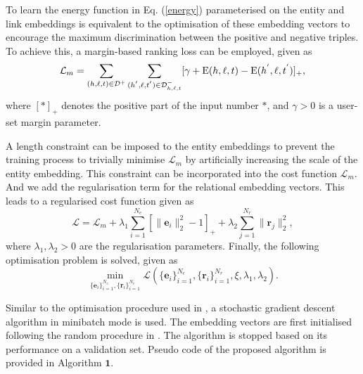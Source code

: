 \documentclass[10pt,journal]{IEEEtran}
\begin{document}
To learn the energy function in Eq. (\ref{energy}) parameterised on the entity and link embeddings is equivalent to the optimisation of these embedding vectors to encourage the maximum discrimination between  the positive  and negative triples. To achieve this, a margin-based ranking loss can be employed, given as
\begin{equation} \label{loss}
\small
\mathcal{L}_m = \sum_{(h,\ell,t)\in \mathcal{D}^+} \sum_{(h^{'},\ell,t^{'})\in  \mathcal{D}^{-}_{h,\ell,t}} [\gamma + \mathrm{E}(h,\ell,t)- \mathrm{E}(h^{'},\ell,t^{'}) ]_+,
\end{equation}
where $[*]_+$ denotes the positive part of the input number $*$, and $\gamma > 0$ is a user-set margin parameter.

A length constraint can be imposed to the entity embeddings to prevent the training process to trivially minimise $\mathcal{L}_m$ by artificially increasing the scale of the entity embedding. This constraint can be incorporated into the cost function $\mathcal{L}_m$.  And we add the regularisation term  for the relational embedding vectors. This leads to a regularised cost function given as
\begin{equation} \label{loss2}
\mathcal{L} = \mathcal{L}_m  +\lambda_1 \sum_{i =1}^{N_e} \left[\|\bm{e}_i\|_2^2 - 1\right]_+ + \lambda_2 \sum_{j=1}^{N_r} \| \bm{r}_{j} \|_2^2,
\end{equation}
where $\lambda_1, \lambda_2 >0$ are the regularisation parameters. Finally, the  following optimisation problem is solved, given as
\begin{equation}
\min_{\{\bm e_i\}_{i=1}^{N_e}, \{\bm r_i\}_{i=1}^{N_r}} \mathcal{L}\left(\{\bm e_i\}_{i=1}^{N_e}, \{\bm r_i\}_{i=1}^{N_r}, \xi,\lambda_1, \lambda_2 \right).
\end{equation}

Similar to the optimisation procedure used in \cite{bordes_translating_2013}, a stochastic gradient descent algorithm in minibatch mode is used. The embedding vectors are first initialised following the random procedure in \cite{glorot_understanding_2010}. The algorithm is stopped based on its performance on a validation set.  Pseudo code of the proposed algorithm is provided in Algorithm $\textbf{1}$.
\end{document}
